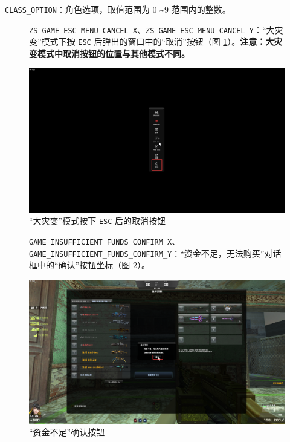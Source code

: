 \lstinline{CLASS_OPTION}：角色选项，取值范围为 0 \textasciitilde 9 范围内的整数。

\begin{figure}[H]
    \Centering
    \parbox[l]{\textwidth}{\lstinline{ZS_GAME_ESC_MENU_CANCEL_X}、\lstinline{ZS_GAME_ESC_MENU_CANCEL_Y}：“大灾变”模式下按 \lstinline{ESC} 后弹出的窗口中的“取消”按钮（图 \ref{ch2fig-zs-esc-cancel}）。\textbf{\color{red}注意：大灾变模式中取消按钮的位置与其他模式不同。}}
    \includegraphics[width=\textwidth]{docs/assets/zs_esc_cancel.png}
    \caption{“大灾变”模式按下 \lstinline{ESC} 后的取消按钮}
    \label{ch2fig-zs-esc-cancel}
\end{figure}

\begin{figure}[H]
    \Centering
    \parbox[l]{\textwidth}{\lstinline{GAME_INSUFFICIENT_FUNDS_CONFIRM_X}、\lstinline{GAME_INSUFFICIENT_FUNDS_CONFIRM_Y}：“资金不足，无法购买”对话框中的“确认”按钮坐标（图 \ref{ch2fig-game-insuff-funds-confirm}）。}
    \includegraphics[width=\textwidth]{docs/assets/game_insuff_funds_confirm.png}
    \caption{“资金不足”确认按钮}
    \label{ch2fig-game-insuff-funds-confirm}
\end{figure}

